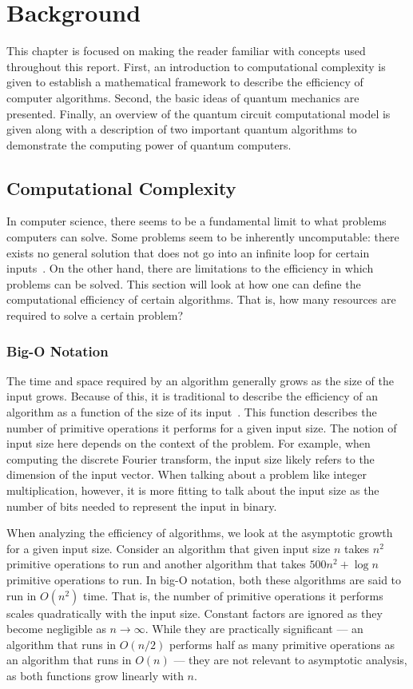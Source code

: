 \chapter{Background} \label{chap:background}
This chapter is focused on making the reader familiar with concepts used throughout this report.
First, an introduction to computational complexity is given to establish a mathematical framework to describe the efficiency of computer algorithms.
Second, the basic ideas of quantum mechanics are presented.
Finally, an overview of the quantum circuit computational model is given along with a description of two important quantum algorithms to demonstrate the computing power of quantum computers.

\section{Computational Complexity}
In computer science, there seems to be a fundamental limit to what problems computers can solve.
Some problems seem to be inherently uncomputable: there exists no general solution that does not go into an infinite loop for certain inputs~\cite{church1936note, turing1937computable}.
On the other hand, there are limitations to the efficiency in which problems can be solved.
This section will look at how one can define the computational efficiency of certain algorithms.
That is, how many resources are required to solve a certain problem?

\subsection{Big-O Notation}
The time and space required by an algorithm generally grows as the size of the input grows.
Because of this, it is traditional to describe the efficiency of an algorithm as a function of the size of its input~\cite{cormen2009introduction}.
This function describes the number of primitive operations it performs for a given input size.
The notion of input size here depends on the context of the problem.
For example, when computing the discrete Fourier transform, the input size likely refers to the dimension of the input vector.
When talking about a problem like integer multiplication, however, it is more fitting to talk about the input size as the number of bits needed to represent the input in binary.

When analyzing the efficiency of algorithms, we look at the asymptotic growth for a given input size.
Consider an algorithm that given input size $n$ takes $n^2$ primitive operations to run and another algorithm that takes $500n^2 + \log n$ primitive operations to run.
In big-O notation, both these algorithms are said to run in $O(n^2)$ time.
That is, the number of primitive operations it performs scales quadratically with the input size.
Constant factors are ignored as they become negligible as $n \to \infty$.
While they are practically significant --- an algorithm that runs in $O(n/2)$ performs half as many primitive operations as an algorithm that runs in $O(n)$ --- they are not relevant to asymptotic analysis, as both functions grow linearly with $n$. 

